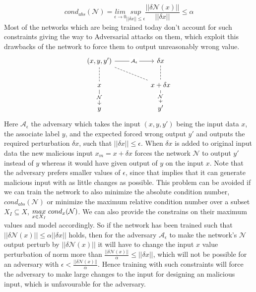 \begin{equation}
    cond_{abs}(\mathcal{N}) = \underset{\epsilon \to 0}{lim}\underset{||\delta x||\le \epsilon}{sup} \frac{||\delta \mathcal{N}(x)||}{||\delta x||} \le \alpha
\end{equation}\newline 
Most of the networks which are being trained today don't account for such constraints giving the way to Adversarial attacks on them, which exploit this drawbacks of the network to force them to output unreasonably wrong value.
\begin{equation}
\begin{tikzcd}
{(x,y,y')} \arrow[rr, "\mathcal{A}_{\epsilon}" description] \arrow[rrd, no head, dashed] \arrow[d, no head, dashed] &  & \delta x \arrow[d, no head, dashed]\\
x \arrow[d, "\mathcal{N}" description] &  & x+\delta x \arrow[d, "\mathcal{N}" description] \\
y& & y'
\end{tikzcd}
\end{equation}\newline
Here $\mathcal{A}_{\epsilon}$ the adversary which takes the input $(x,y,y')$ being the input data $x$, the associate label $y$, and the expected forced wrong output $y'$ and outputs the required perturbation $\delta x$, such that $||\delta x|| \le \epsilon$. When $\delta x$ is added to original input data the new malicious input $x_m = x + \delta x$ forces the network $\mathcal{N}$ to output $y'$ instead of $y$ whereas it would have given output of $y$ on the input $x$. Note that the adversary prefers smaller values of $\epsilon$, since that implies that it can generate malicious input with as little changes as possible.\newline
This problem can be avoided if we can train the network to also minimize the absolute condition number, $cond_{abs}(\mathcal{N})$ or minimize the maximum relative condition number over a subset $X_{I} \subseteq X$, $\underset{x \in X_{I}}{max}\hspace{1mm} cond_{x}(\mathcal{N})$. We can also provide the constrains on their maximum values and model accordingly.\newline
So if the network has been trained such that $||\delta \mathcal{N}(x)||\le \alpha ||\delta x||$ holds, then for the adversary $\mathcal{A}_{\epsilon}$ to make the network's $\mathcal{N}$ output perturb by $||\delta \mathcal{N}(x)||$ it will have to change the input $x$ value perturbation of norm more than $\frac{||\delta \mathcal{N}(x)||}{\alpha} \le ||\delta x||$, which will not be possible for an adversary with $\epsilon < \frac{||\delta \mathcal{N}(x)||}{\alpha}$. Hence training with such constraints will force the adversary to make large changes to the input for designing an malicious input, which is unfavourable for the adversary.